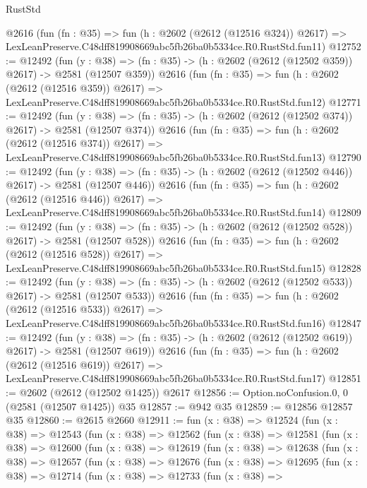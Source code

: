 \begin{lexlean}{RustStd}
\begin{coremodule}
    @2616
    (fun (fn : @35) =>
    fun (h : @2602 (@2612 (@12516 @324)) @2617) =>
    LexLeanPreserve.C48dff819908669abc5fb26ba0b5334ce.R0.RustStd.fun11)
@12752 := @12492
    (fun (y : @38) => (fn : @35) -> (h : @2602 (@2612 (@12502 @359)) @2617) -> @2581 (@12507 @359))
    @2616
    (fun (fn : @35) =>
    fun (h : @2602 (@2612 (@12516 @359)) @2617) =>
    LexLeanPreserve.C48dff819908669abc5fb26ba0b5334ce.R0.RustStd.fun12)
@12771 := @12492
    (fun (y : @38) => (fn : @35) -> (h : @2602 (@2612 (@12502 @374)) @2617) -> @2581 (@12507 @374))
    @2616
    (fun (fn : @35) =>
    fun (h : @2602 (@2612 (@12516 @374)) @2617) =>
    LexLeanPreserve.C48dff819908669abc5fb26ba0b5334ce.R0.RustStd.fun13)
@12790 := @12492
    (fun (y : @38) => (fn : @35) -> (h : @2602 (@2612 (@12502 @446)) @2617) -> @2581 (@12507 @446))
    @2616
    (fun (fn : @35) =>
    fun (h : @2602 (@2612 (@12516 @446)) @2617) =>
    LexLeanPreserve.C48dff819908669abc5fb26ba0b5334ce.R0.RustStd.fun14)
@12809 := @12492
    (fun (y : @38) => (fn : @35) -> (h : @2602 (@2612 (@12502 @528)) @2617) -> @2581 (@12507 @528))
    @2616
    (fun (fn : @35) =>
    fun (h : @2602 (@2612 (@12516 @528)) @2617) =>
    LexLeanPreserve.C48dff819908669abc5fb26ba0b5334ce.R0.RustStd.fun15)
@12828 := @12492
    (fun (y : @38) => (fn : @35) -> (h : @2602 (@2612 (@12502 @533)) @2617) -> @2581 (@12507 @533))
    @2616
    (fun (fn : @35) =>
    fun (h : @2602 (@2612 (@12516 @533)) @2617) =>
    LexLeanPreserve.C48dff819908669abc5fb26ba0b5334ce.R0.RustStd.fun16)
@12847 := @12492
    (fun (y : @38) => (fn : @35) -> (h : @2602 (@2612 (@12502 @619)) @2617) -> @2581 (@12507 @619))
    @2616
    (fun (fn : @35) =>
    fun (h : @2602 (@2612 (@12516 @619)) @2617) =>
    LexLeanPreserve.C48dff819908669abc5fb26ba0b5334ce.R0.RustStd.fun17)
@12851 := @2602 (@2612 (@12502 @1425)) @2617
@12856 := Option.noConfusion.{0, 0} (@2581 (@12507 @1425)) @35
@12857 := @942 @35
@12859 := @12856 @12857 @35
@12860 := @2615 @2660
@12911 := fun (x : @38) =>
  @12524
    (fun (x : @38) =>
    @12543
      (fun (x : @38) =>
      @12562
        (fun (x : @38) =>
        @12581
          (fun (x : @38) =>
          @12600
            (fun (x : @38) =>
            @12619
              (fun (x : @38) =>
              @12638
                (fun (x : @38) =>
                @12657
                  (fun (x : @38) =>
                  @12676
                    (fun (x : @38) =>
                    @12695
                      (fun (x : @38) =>
                      @12714
                        (fun (x : @38) =>
                        @12733
                          (fun (x : @38) =>

\end{coremodule}
\end{lexlean}
